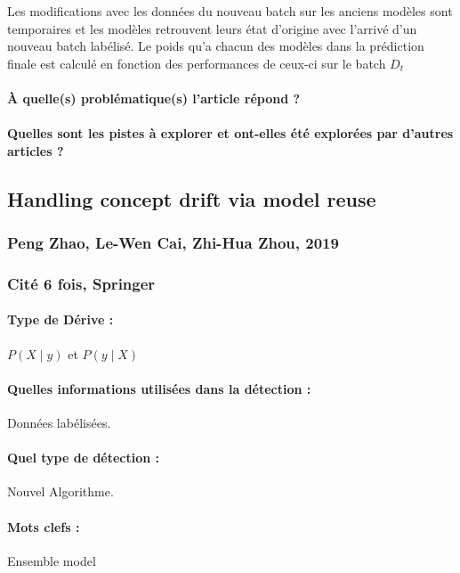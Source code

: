 \documentclass[11pt,a4paper]{report}
\begin{document}
Les  modifications avec les données du nouveau batch sur les anciens modèles sont temporaires et les modèles retrouvent leurs état d'origine avec l'arrivé d'un nouveau batch labélisé. Le poids qu'a chacun des modèles dans la prédiction finale est calculé en fonction des performances de ceux-ci sur le batch $D_t$

\paragraph{À quelle(s) problématique(s) l'article répond ?} 

\paragraph{Quelles sont les pistes à explorer et ont-elles  été explorées par d'autres articles ?} 









\subsection{Handling concept drift via model reuse}
\subsubsection{Peng Zhao, Le-Wen Cai, Zhi-Hua Zhou, 2019}

\subsubsection{Cité 6 fois, Springer}

\paragraph{Type de Dérive :} $P(X\mid y)$ et $P(y \mid X)$
\paragraph{Quelles informations utilisées dans la détection :} Données labélisées.
\paragraph{Quel type de détection :} Nouvel Algorithme.

\paragraph{Mots clefs :} Ensemble model
\end{document}

